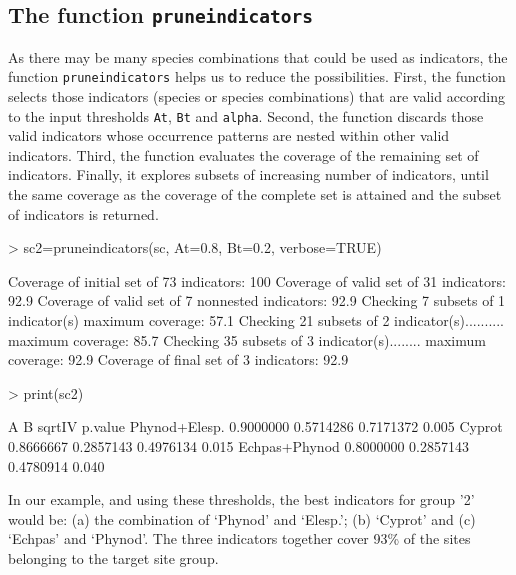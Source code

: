 \documentclass[11pt,a4paper]{article}
\begin{document}
\subsection{The function \texttt{pruneindicators}}
As there may be many species combinations that could be used as indicators, the function \texttt{pruneindicators} helps us to reduce the possibilities. First, the function selects those indicators (species or species combinations) that are valid according to the input thresholds \texttt{At}, \texttt{Bt} and \texttt{alpha}. Second, the function discards those valid indicators whose occurrence patterns are nested within other valid indicators. Third, the function evaluates the coverage of the remaining set of indicators. Finally, it explores subsets of increasing number of indicators, until the same coverage as the coverage of the complete set is attained and the subset of indicators is returned.
\begin{Schunk}
\begin{Sinput}
> sc2=pruneindicators(sc, At=0.8, Bt=0.2, verbose=TRUE)
\end{Sinput}
\begin{Soutput}
Coverage of initial set of 73 indicators: 100%
Coverage of valid set of 31 indicators: 92.9%
Coverage of valid set of 7 nonnested indicators: 92.9%
Checking 7 subsets of 1 indicator(s) maximum coverage: 57.1%
Checking 21 subsets of 2 indicator(s).......... maximum coverage: 85.7%
Checking 35 subsets of 3 indicator(s)........ maximum coverage: 92.9%
Coverage of final set of 3 indicators: 92.9%
\end{Soutput}
\begin{Sinput}
> print(sc2)
\end{Sinput}
\begin{Soutput}
                      A         B    sqrtIV p.value
Phynod+Elesp. 0.9000000 0.5714286 0.7171372   0.005
Cyprot        0.8666667 0.2857143 0.4976134   0.015
Echpas+Phynod 0.8000000 0.2857143 0.4780914   0.040
\end{Soutput}
\end{Schunk}
In our example, and using these thresholds, the best indicators for group '2' would be: (a) the combination of `Phynod' and `Elesp.'; (b) `Cyprot' and (c) `Echpas' and `Phynod'. The three indicators together cover 93\% of the sites belonging to the target site group.
\end{document}
